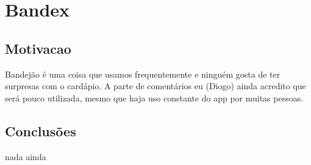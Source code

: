 \section{Bandex}

\subsection{Motivacao}
Bandejão é uma coisa que usamos frequentemente e ninguém gosta de ter
surpresas com o cardápio. A parte de comentários eu (Diogo) ainda acredito
que será pouco utilizada, mesmo que haja uso constante do app por muitas
pessoas.

\subsection{Conclusões}
nada ainda

